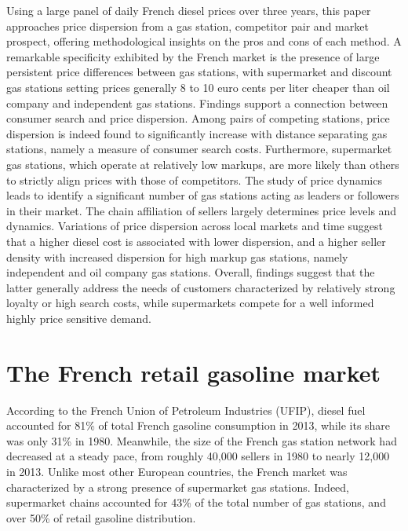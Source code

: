 \documentclass[english]{article}
\begin{document}
Using a large panel of daily French diesel prices over three years, this paper approaches price dispersion from a gas station, competitor pair and market prospect, offering methodological insights on the pros and cons of each method. A remarkable specificity exhibited by the French market is the presence of large persistent price differences between gas stations, with supermarket and discount gas stations setting prices generally 8 to 10 euro cents per liter cheaper than oil company and independent gas stations. Findings support a connection between consumer search and price dispersion. Among pairs of competing stations, price dispersion is indeed found to significantly increase with distance separating gas stations, namely a measure of consumer search costs. Furthermore, supermarket gas stations, which operate at relatively low markups, are more likely than others to strictly align prices with those of competitors. The study of price dynamics leads to identify a significant number of gas stations acting as leaders or followers in their market. The chain affiliation of sellers largely determines price levels and dynamics. Variations of price dispersion across local markets and time suggest that a higher diesel cost is associated with lower dispersion, and a higher seller density with increased dispersion for high markup gas stations, namely independent and oil company gas stations. Overall, findings suggest that the latter generally address the needs of customers characterized by relatively strong loyalty or high search costs, while supermarkets compete for a well informed highly price sensitive demand.

\section{The French retail gasoline market}

According to the French Union of Petroleum Industries (UFIP), diesel fuel accounted for 81\% of total French gasoline consumption in 2013, while its share was only 31\% in 1980. Meanwhile, the size of the French gas station network had decreased at a steady pace, from roughly 40,000 sellers in 1980 to nearly 12,000 in 2013. Unlike most other European countries, the French market was characterized by a strong presence of supermarket gas stations. Indeed, supermarket chains accounted for 43\% of the total number of gas stations, and over 50\% of retail gasoline distribution.
\end{document}

